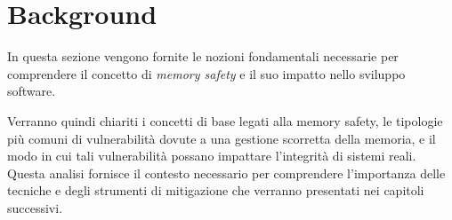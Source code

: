 \chapter{Background}
\label{cha:background}

In questa sezione vengono fornite le nozioni fondamentali necessarie per
comprendere il concetto di \textit{memory safety} e il suo impatto nello sviluppo
software.

Verranno quindi chiariti i concetti di base legati alla memory safety, le tipologie
più comuni di vulnerabilità dovute a una gestione scorretta della memoria, e il
modo in cui tali vulnerabilità possano impattare l'integrità di sistemi reali. Questa
analisi fornisce il contesto necessario per comprendere l'importanza delle tecniche
e degli strumenti di mitigazione che verranno presentati nei capitoli successivi.





